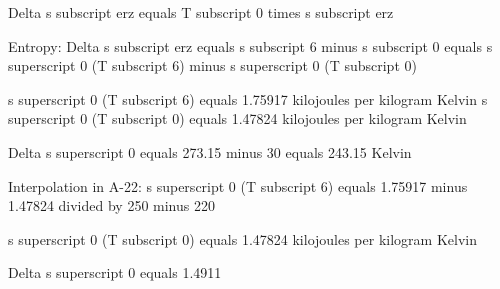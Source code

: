 Delta s subscript erz equals T subscript 0 times s subscript erz  

Entropy:  
Delta s subscript erz equals s subscript 6 minus s subscript 0 equals s superscript 0 (T subscript 6) minus s superscript 0 (T subscript 0)  

s superscript 0 (T subscript 6) equals 1.75917 kilojoules per kilogram Kelvin  
s superscript 0 (T subscript 0) equals 1.47824 kilojoules per kilogram Kelvin  

Delta s superscript 0 equals 273.15 minus 30 equals 243.15 Kelvin  

Interpolation in A-22:  
s superscript 0 (T subscript 6) equals 1.75917 minus 1.47824 divided by 250 minus 220  

s superscript 0 (T subscript 0) equals 1.47824 kilojoules per kilogram Kelvin  

Delta s superscript 0 equals 1.4911